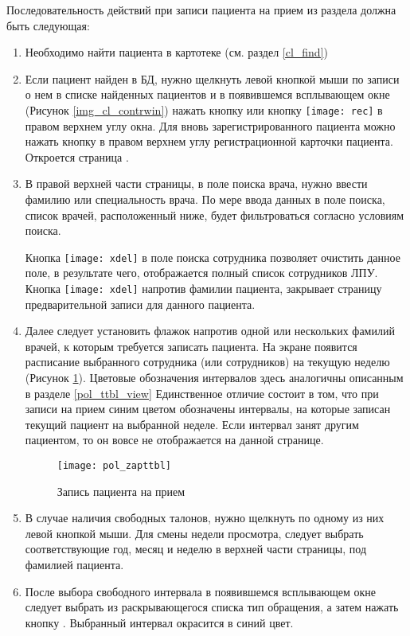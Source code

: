 Последовательность действий при записи пациента на прием  {из раздела }{} должна быть следующая:
\begin{enumerate}
 \item \label{n4} Необходимо найти пациента в картотеке (см. раздел \ref{cl_find}) 
 \item Если пациент найден в БД, нужно щелкнуть левой кнопкой мыши по записи о нем в списке найденных пациентов и в появившемся всплывающем окне (Рисунок \ref{img_cl_contrwin}) нажать кнопку  или кнопку \texttt{[image: rec]} в правом верхнем углу окна. Для вновь зарегистрированного пациента можно нажать кнопку  в правом верхнем углу регистрационной карточки пациента. Откроется страница .  
 \item В правой верхней части страницы, в поле поиска врача, нужно ввести фамилию или специальность врача. По мере ввода данных в поле поиска, список врачей, расположенный ниже, будет фильтроваться согласно условиям поиска.
 
 \begin{prim}
   Кнопка  \texttt{[image: xdel]} в поле поиска сотрудника позволяет очистить данное поле, в результате чего, отображается полный список сотрудников ЛПУ. Кнопка  \texttt{[image: xdel]} напротив фамилии пациента, закрывает страницу предварительной записи для данного пациента.
  \end{prim}
  
 \item \label{n5} Далее следует установить флажок напротив одной или нескольких фамилий врачей, к которым требуется записать пациента. На экране появится расписание выбранного сотрудника (или сотрудников) на текущую неделю (Рисунок \ref{img_pol_zapttbl}). Цветовые обозначения интервалов здесь аналогичны описанным в разделе \ref{pol_ttbl_view} Единственное отличие состоит в том, что при записи на прием  синим цветом обозначены интервалы, на которые записан текущий пациент на выбранной неделе. Если интервал занят другим пациентом, то он вовсе не отображается на данной странице.
 
 \begin{figure}[ht]\centering
  \texttt{[image: pol\_zapttbl]}
  \caption{Запись пациента на прием}
  \label{img_pol_zapttbl}
 \end{figure}
 
 \item В случае наличия свободных талонов, нужно щелкнуть по одному из них левой кнопкой мыши. Для смены недели просмотра, следует выбрать соответствующие год, месяц и неделю в верхней части страницы, под фамилией пациента.
 \item После выбора свободного интервала в появившемся всплывающем окне следует выбрать из раскрывающегося списка тип обращения, а затем нажать кнопку . Выбранный интервал окрасится в синий цвет.
\end{enumerate}

